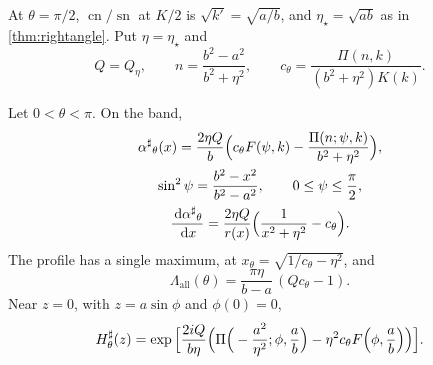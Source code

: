 At $\theta=\pi/2$, $\operatorname{cn}/\operatorname{sn}$ at $K/2$ is
$\sqrt{k'}=\sqrt{a/b}$, and $\eta_\star=\sqrt{ab}$ as in \cref{thm:rightangle}.
Put $\eta=\eta_\star$ and
\begin{equation}\label{eq:ellipticparam}
Q=Q_\eta,\qquad n=\frac{b^2-a^2}{b^2+\eta^2},\qquad
c_\theta=\frac{\Pi(n,k)}{(b^2+\eta^2)K(k)} .
\end{equation}

\begin{theorem}\label{thm:ellipticprofile}
Let $0<\theta<\pi$. On the band,
\begin{gather}
{\alpha^{\sharp}}_\theta(x)=\frac{2\eta Q}b\Big(c_\theta F(\psi,k)-\frac{\Pi(n;\psi,k)}{b^2+\eta^2}\Big),
\label{eq:alphaelliptic}\\
\sin^2\psi=\frac{b^2-x^2}{b^2-a^2},\qquad 0\le\psi\le\frac\pi2,\notag\\
\frac{\,\mathrm d{\alpha^{\sharp}}_\theta}{\,\mathrm d x}=\frac{2\eta Q}{r(x)}\Big(\frac1{x^2+\eta^2}-c_\theta\Big).
\label{eq:alphaellipticprime}
\end{gather}
The profile has a single maximum, at $x_\theta=\sqrt{1/c_\theta-\eta^2}$, and
\begin{equation}\label{eq:ellipticmean}
\Lambda_{\mathrm{all}}(\theta)=\frac{\pi\eta}{b-a}\,(Qc_\theta-1).
\end{equation}
Near $z=0$, with $z=a\sin\phi$ and $\phi(0)=0$,
\begin{equation}\label{eq:transferelliptic}
H^{\sharp}_\theta(z)=\exp\Big[\frac{2iQ}{b\eta}\Big(\Pi\Big(-\frac{a^2}{\eta^2};\phi,\frac ab\Big)
-\eta^2c_\theta F\Big(\phi,\frac ab\Big)\Big)\Big].
\end{equation}
\end{theorem}

